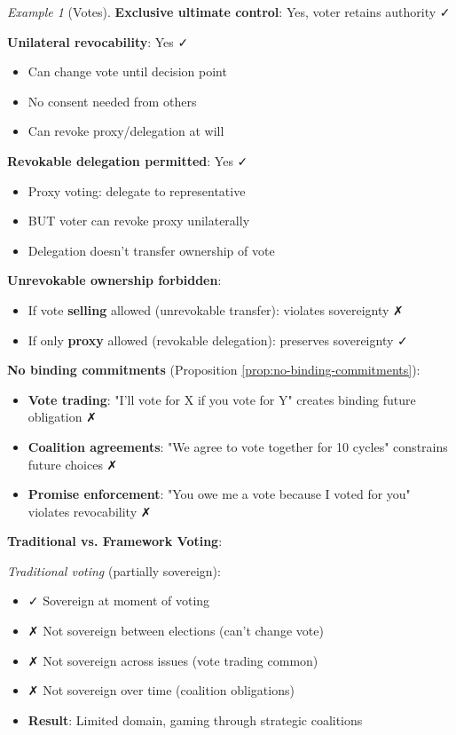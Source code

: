 \documentclass[11pt,a4paper]{article}
\theoremstyle{definition}
\theoremstyle{remark}
\newtheorem{example}[theorem]{Example}
\begin{document}
\begin{example}[Votes]
\textbf{Exclusive ultimate control}: Yes, voter retains authority ✓

\textbf{Unilateral revocability}: Yes ✓
\begin{itemize}
\item Can change vote until decision point
\item No consent needed from others
\item Can revoke proxy/delegation at will
\end{itemize}

\textbf{Revokable delegation permitted}: Yes ✓
\begin{itemize}
\item Proxy voting: delegate to representative
\item BUT voter can revoke proxy unilaterally
\item Delegation doesn't transfer ownership of vote
\end{itemize}

\textbf{Unrevokable ownership forbidden}:
\begin{itemize}
\item If vote \textbf{selling} allowed (unrevokable transfer): violates sovereignty ✗
\item If only \textbf{proxy} allowed (revokable delegation): preserves sovereignty ✓
\end{itemize}

\textbf{No binding commitments} (Proposition \ref{prop:no-binding-commitments}):
\begin{itemize}
\item \textbf{Vote trading}: "I'll vote for X if you vote for Y" creates binding future obligation ✗
\item \textbf{Coalition agreements}: "We agree to vote together for 10 cycles" constrains future choices ✗
\item \textbf{Promise enforcement}: "You owe me a vote because I voted for you" violates revocability ✗
\end{itemize}

\textbf{Traditional vs. Framework Voting}:

\textit{Traditional voting} (partially sovereign):
\begin{itemize}
\item ✓ Sovereign at moment of voting
\item ✗ Not sovereign between elections (can't change vote)
\item ✗ Not sovereign across issues (vote trading common)
\item ✗ Not sovereign over time (coalition obligations)
\item \textbf{Result}: Limited domain, gaming through strategic coalitions
\end{itemize}


\end{example}
\end{document}
